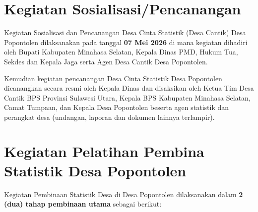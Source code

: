 \section{Kegiatan Sosialisasi/Pencanangan}

Kegiatan Sosialisasi dan Pencanangan Desa Cinta Statistik (Desa Cantik) Desa Popontolen dilaksanakan pada tanggal \textbf{\textcolor{bpsnavy}{07 Mei 2026}} di mana kegiatan dihadiri oleh Bupati Kabupaten Minahasa Selatan, Kepala Dinas PMD, Hukum Tua, Sekdes dan Kepala Jaga serta Agen Desa Cantik Desa Popontolen.

Kemudian kegiatan pencanangan Desa Cinta Statistik Desa Popontolen dicanangkan secara resmi oleh Kepala Dinas dan disaksikan oleh Ketua Tim Desa Cantik BPS Provinsi Sulawesi Utara, Kepala BPS Kabupaten Minahasa Selatan, Camat Tumpaan, dan Kepala Desa Popontolen beserta agen statistik dan perangkat desa (undangan, laporan dan dokumen lainnya terlampir).

\section{Kegiatan Pelatihan Pembina Statistik Desa Popontolen}

Kegiatan Pembinaan Statistik Desa di Desa Popontolen dilaksanakan dalam \textbf{\textcolor{bpsnavy}{2 (dua) tahap pembinaan utama}} sebagai berikut:

